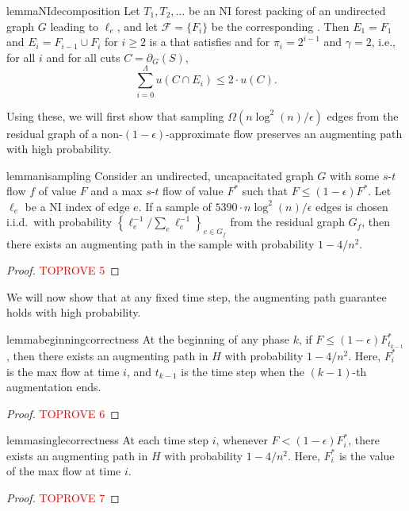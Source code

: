\documentclass[11pt,a4paper]{article}
\newcommand{\eps}{\epsilon}
\newcommand{\samplesize}{\ensuremath{5390 \cdot n \log^2(n)/\eps}}
\begin{document}
\begin{restatable}{lemma}{NIdecomposition}
\label{lem:NIdecomposition}
Let $T_1, T_2, \ldots$ be an NI forest packing of an undirected graph $G$ leading to \niindices $\ell_e$, and let $\mathcal F = \{ F_i \}$ be the corresponding \connectivityclasses. Then $E_1 = F_1$ and $E_i = F_{i-1} \cup F_i$ for $i \ge 2$ is a \decomposition that satisfies \piconnectivity and \gammaoverlap for $\pi_i = 2^{i-1}$ and $\gamma = 2$, i.e.,
 for all $i$ and for all cuts $C = \partial_{G}(S)$,
\[
\sum_{i = 0}^\Lambda u(C \cap E_i) \le 2 \cdot u(C).
\]
\end{restatable}

Using these, we will first show that sampling $\Omega(n \log^2(n)/\eps)$ edges from the residual graph of a non-$(1-\eps)$-approximate flow preserves an augmenting path with high probability.

\begin{restatable}{lemma}{nisampling}
\label{lem:nisampling}
Consider an undirected, uncapacitated graph $G$ with some $s$-$t$ flow $f$ of value $F$ and a max $s$-$t$ flow of value  $F^*$ such that $F \le (1-\eps) F^*$. Let $\ell_e$ be a NI index of edge $e$. If a sample of $\samplesize$ edges is chosen i.i.d.~with probability $\left\{ \ell_e^{-1} / \sum_e \ell_e^{-1} \right\}_{e \in G_f}$ from the residual graph $G_f$, then there exists an augmenting path in the sample with probability $1 - 4/n^2$.
\end{restatable}
\begin{proof}\textcolor{red}{TOPROVE 5}\end{proof}

We will now show that at any fixed time step, the augmenting path guarantee holds with high probability.

\begin{restatable}{lemma}{beginningcorrectness}
\label{lem:beginningcorrectness}
At the beginning of any phase $k$, if $F \le (1-\eps)F^*_{t_{k-1}}$, then there exists an augmenting path in $H$ with probability $1 - 4/n^2$. Here, $F^*_i$ is the max flow at time $i$, and $t_{k-1}$ is the time step when the $(k-1)$-th augmentation ends.
\end{restatable}
\begin{proof}\textcolor{red}{TOPROVE 6}\end{proof}

\begin{restatable}{lemma}{singlecorrectness}
\label{lem:singlecorrectness}
At each time step $i$, whenever $F < (1-\eps) F^*_i$, there exists an augmenting path in $H$ with probability $1 - 4/n^2$. Here, $F^*_i$ is the value of the max flow at time $i$.
\end{restatable}
\begin{proof}\textcolor{red}{TOPROVE 7}\end{proof}
\end{document}

